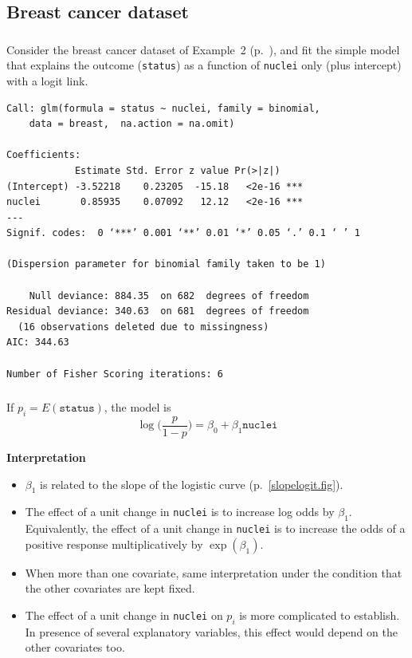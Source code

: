 \documentclass{beamer}
\newcommand{\bs}{\bigskip}
\begin{document}
\subsection{Breast cancer dataset}

\begin{frame}[fragile]
\frametitle{}

Consider the breast cancer dataset of Example~2
(p.~\pageref{example2}), and fit the simple model that explains the
outcome (\texttt{status}) as a function
of \texttt{nuclei} only (plus intercept) with a logit link.

\bs

{\scriptsize
\begin{verbatim}
Call: glm(formula = status ~ nuclei, family = binomial, 
    data = breast,  na.action = na.omit)

Coefficients:
            Estimate Std. Error z value Pr(>|z|)    
(Intercept) -3.52218    0.23205  -15.18   <2e-16 ***
nuclei       0.85935    0.07092   12.12   <2e-16 ***
---
Signif. codes:  0 ‘***’ 0.001 ‘**’ 0.01 ‘*’ 0.05 ‘.’ 0.1 ‘ ’ 1

(Dispersion parameter for binomial family taken to be 1)

    Null deviance: 884.35  on 682  degrees of freedom
Residual deviance: 340.63  on 681  degrees of freedom
  (16 observations deleted due to missingness)
AIC: 344.63

Number of Fisher Scoring iterations: 6
\end{verbatim}
}
\end{frame}

\begin{frame}
\frametitle{}
If $p_i = E(\texttt{status})$, the model is
$$\log\Big(\frac{p}{1-p}\Big) = \beta_0 + \beta_1 \texttt{nuclei}$$

\bs

\textbf{Interpretation}
\begin{itemize}
\item $\beta_1$ is related to the slope of the logistic curve (p.~\ref{slopelogit.fig}).
\item The effect of a unit change in \texttt{nuclei} is to increase log odds by
$\beta_1$. Equivalently, the effect of a unit change in  \texttt{nuclei} is to
increase the odds of a positive response multiplicatively by $\exp(\beta_1)$.
\item When more than one
covariate, same interpretation under the condition that the
other covariates are kept fixed.
\item The effect of a unit change in \texttt{nuclei} on $p_i$ is more
complicated to establish. In presence of several explanatory variables, this
effect would depend on the other covariates too.
\end{itemize}

\end{frame}
\end{document}
